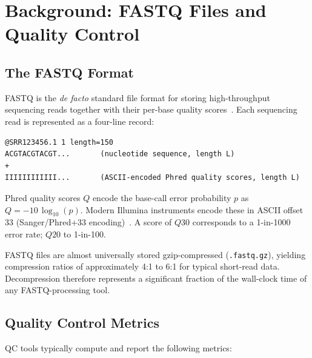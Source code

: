 \documentclass[a4paper,12pt]{article}
\begin{document}
\section{Background: FASTQ Files and Quality Control}
\label{sec:background}

\subsection{The FASTQ Format}

FASTQ is the \emph{de facto} standard file format for storing high-throughput
sequencing reads together with their per-base quality scores~\cite{Cock2010FASTQ}.
Each sequencing read is represented as a four-line record:

\begin{lstlisting}
@SRR123456.1 1 length=150
ACGTACGTACGT...       (nucleotide sequence, length L)
+
IIIIIIIIIIII...       (ASCII-encoded Phred quality scores, length L)
\end{lstlisting}

Phred quality scores $Q$ encode the base-call error probability $p$ as
$Q = -10\,\log_{10}(p)$.  Modern Illumina instruments encode these in ASCII
offset 33 (Sanger/Phred+33 encoding)~\cite{Cock2010FASTQ}.  A score of
$Q30$ corresponds to a 1-in-1000 error rate; $Q20$ to 1-in-100.

FASTQ files are almost universally stored gzip-compressed (\texttt{.fastq.gz}),
yielding compression ratios of approximately 4:1 to 6:1 for typical short-read
data.  Decompression therefore represents a significant fraction of the
wall-clock time of any FASTQ-processing tool.

\subsection{Quality Control Metrics}

QC tools typically compute and report the following metrics:
\end{document}
